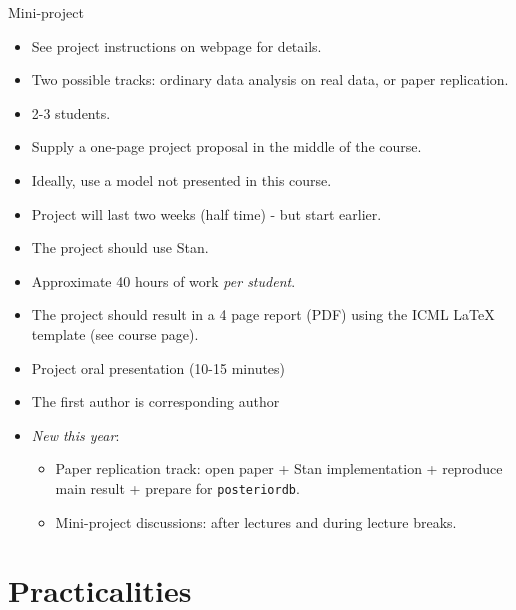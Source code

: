 \documentclass[10pt]{beamer}
\begin{document}
\begin{frame}{Mini-project}

\begin{itemize}
\item See project instructions on webpage for details.
\item Two possible tracks: ordinary data analysis on real data, or paper replication.
\item 2-3 students.\pause
\item Supply a one-page project proposal in the middle of the course.\pause
\item Ideally, use a model not presented in this course.
\item Project will last two weeks (half time) - but start earlier.
\item The project should use Stan.
\item Approximate 40 hours of work \emph{per student}.\pause
\item The project should result in a 4 page report (PDF) using the ICML LaTeX template (see course page).
\item Project oral presentation (10-15 minutes)\pause
\item The first author is corresponding author\pause
\item \emph{New this year}:
\begin{itemize}
\item Paper replication track: open paper + Stan implementation + reproduce main result + prepare for \texttt{posteriordb}.
\item Mini-project discussions: after lectures and during lecture breaks.
\end{itemize}
\end{itemize}
\end{frame}


\section{Practicalities}
\frame{\sectionpage}
\end{document}
